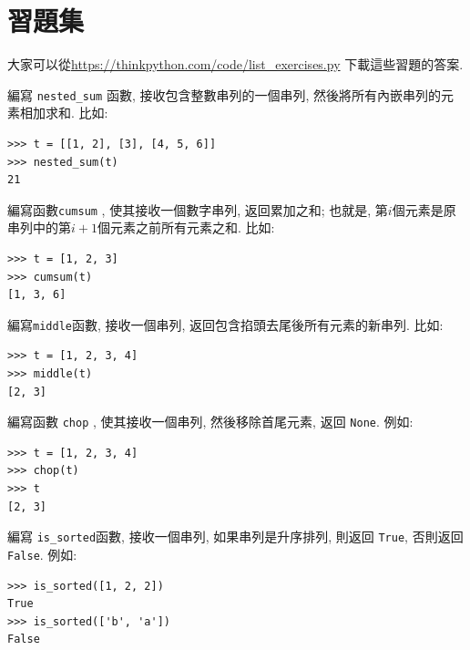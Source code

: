 \documentclass[10pt]{book}
\begin{document}
\section{習題集}

大家可以從\url{https://thinkpython.com/code/list_exercises.py}
下載這些習題的答案.

\begin{exercise}

編寫 \verb"nested_sum" 函數, 接收包含整數串列的一個串列, 
然後將所有內嵌串列的元素相加求和. 
比如:

\begin{verbatim}
>>> t = [[1, 2], [3], [4, 5, 6]]
>>> nested_sum(t)
21
\end{verbatim}

\end{exercise}

\begin{exercise}
\label{cumulative}
編寫函數{\tt cumsum} , 使其接收一個數字串列, 返回累加之和;
也就是, 第$i$個元素是原串列中的第$i+1$個元素之前所有元素之和. 
比如:

\begin{verbatim}
>>> t = [1, 2, 3]
>>> cumsum(t)
[1, 3, 6]
\end{verbatim}

\end{exercise}

\begin{exercise}

編寫\verb"middle"函數, 接收一個串列, 返回包含掐頭去尾後所有元素的新串列. 
比如:

\begin{verbatim}
>>> t = [1, 2, 3, 4]
>>> middle(t)
[2, 3]
\end{verbatim}

\end{exercise}

\begin{exercise}
編寫函數 \verb"chop" , 使其接收一個串列, 然後移除首尾元素, 返回 {\tt None}.
例如:

\begin{verbatim}
>>> t = [1, 2, 3, 4]
>>> chop(t)
>>> t
[2, 3]
\end{verbatim}

\end{exercise}


\begin{exercise}
編寫 \verb"is_sorted"函數, 接收一個串列, 如果串列是升序排列, 則返回 {\tt True}, 
否則返回 {\tt False}. 例如:

\begin{verbatim}
>>> is_sorted([1, 2, 2])
True
>>> is_sorted(['b', 'a'])
False
\end{verbatim}

\end{exercise}
\end{document}
